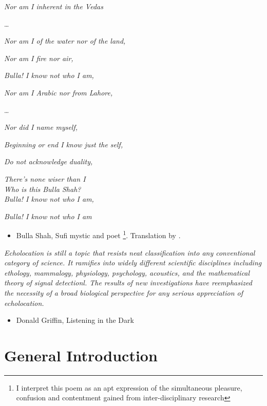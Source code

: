\documentclass[
]{book}
\providecommand{\tightlist}{%
  \setlength{\itemsep}{0pt}\setlength{\parskip}{0pt}}
\begin{document}
\emph{Nor am I inherent in the Vedas}

\ldots{}

\emph{Nor am I of the water nor of the land,}

\emph{Nor am I fire nor air,}

\emph{Bulla! I know not who I am,}

\emph{Nor am I Arabic nor from Lahore,}

\ldots{}

\emph{Nor did I name myself,}

\emph{Beginning or end I know just the self,}

\emph{Do not acknowledge duality,}

\emph{There's none wiser than I}\\

\emph{Who is this Bulla Shah?}\\

\emph{Bulla! I know not who I am,}

\emph{Bulla! I know not who I am}

\begin{itemize}
\tightlist
\item
  Bulla Shah, Sufi mystic and poet \footnote{I interpret this poem as an apt expression of the simultaneous pleasure, confusion and contentment gained from inter-disciplinary research}. Translation by \citet{bullashahtransl}.
\end{itemize}

\emph{Echolocation is still a topic that resists neat classification into any conventional category of science. It ramifies into widely different scientific disciplines including ethology, mammalogy, physiology, psychology, acoustics, and the mathematical theory of signal detectionl. The results of new investigations have reemphasized the necessity of a broad biological perspective for any serious appreciation of echolocation.}

\begin{itemize}
\tightlist
\item
  Donald Griffin, Listening in the Dark
\end{itemize}

\newpage

\hypertarget{general-introduction}{%
\chapter{General Introduction}\label{general-introduction}}
\end{document}
